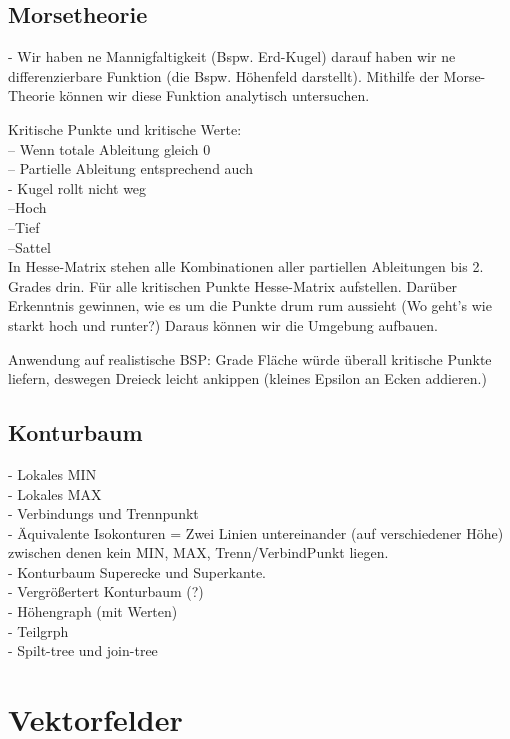 \documentclass{article}
\begin{document}
\subsection{Morsetheorie}
- Wir haben ne Mannigfaltigkeit (Bspw. Erd-Kugel) darauf haben wir ne differenzierbare Funktion (die Bspw. Höhenfeld darstellt). Mithilfe der Morse-Theorie können wir diese Funktion analytisch untersuchen.

Kritische Punkte und kritische Werte:\\
-- Wenn totale Ableitung gleich 0\\
-- Partielle Ableitung entsprechend auch\\
- Kugel rollt nicht weg\\
--Hoch\\
--Tief\\
--Sattel\\

In Hesse-Matrix stehen alle Kombinationen aller partiellen Ableitungen bis 2. Grades drin.
Für alle kritischen Punkte Hesse-Matrix aufstellen. Darüber Erkenntnis gewinnen, wie es um die Punkte drum rum aussieht (Wo geht's wie starkt hoch und runter?) Daraus können wir die Umgebung aufbauen.

Anwendung auf realistische BSP: Grade Fläche würde überall kritische Punkte liefern, deswegen Dreieck leicht ankippen (kleines Epsilon an Ecken addieren.)

\subsection{Konturbaum}
- Lokales MIN\\
- Lokales MAX\\
- Verbindungs und Trennpunkt\\

- Äquivalente Isokonturen = Zwei Linien untereinander (auf verschiedener Höhe) zwischen denen kein MIN, MAX, Trenn/VerbindPunkt liegen.\\

- Konturbaum Superecke und Superkante.\\

- Vergrößertert Konturbaum (?)\\
- Höhengraph (mit Werten)\\
- Teilgrph\\
- Spilt-tree und join-tree\\


\pagebreak
\section{Vektorfelder}
\end{document}
